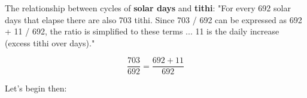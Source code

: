 \documentclass[11pt,oneside]{memoir-article}
\begin{document}
\newcommand\cheatsheetPar{\marginpar{\vspace*{1\baselineskip}\footnotesize\cheatsheetText}}

\makeatother


\clearpage

The relationship between cycles of \textbf{solar days} and \textbf{tithi}:
"For every 692 solar days that elapse there are also 703 tithi.
Since 703 / 692 can be expressed as 692 + 11 / 692, the ratio is simplified to these terms ...
11 is the daily increase (excess tithi over days)."\autocite[p. 48]{eade1995calendrical}

\begin{equation}
\frac{703}{692} = \frac{692 + 11}{692}
\end{equation}

Let's begin then:

\cheatsheetPar
\end{document}
